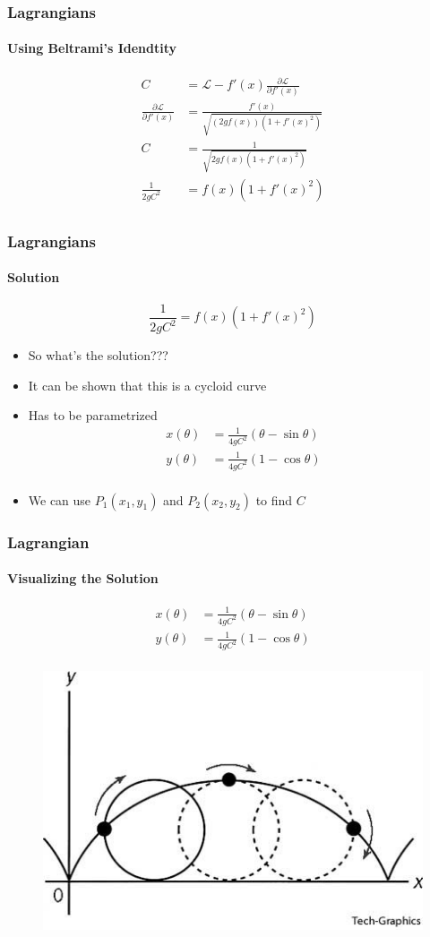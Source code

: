 \documentclass[12pt]{beamer}
\begin{document}
\begin{frame}
\frametitle{Lagrangians}
\framesubtitle{Using Beltrami's Idendtity}
\begin{align*}
    C &= \mathcal{L} - f'(x) \frac{\partial \mathcal{L}}{\partial f'(x)} \\
    \frac{\partial \mathcal{L}}{\partial f'(x)} &= \frac{f'(x)}{\sqrt{\left (2g f(x)  \right) \left (1 + f'(x)^2 \right)}} \\
    C &= \frac{1}{\sqrt{2gf(x) \left (1 + f'(x)^2 \right)}} \\
    \frac{1}{2gC^2} &= f(x) \left (1 + f'(x)^2 \right ) \\
\end{align*}
\end{frame}

\begin{frame}
\frametitle{Lagrangians}
\framesubtitle{Solution}
$$\frac{1}{2gC^2} = f(x) \left (1 + f'(x)^2 \right )$$
\pause
\begin{itemize}
    \item So what's the solution???
    \pause
    \item It can be shown that this is a cycloid curve
    \pause
    \item Has to be parametrized
    \begin{align*}
    x (\theta) &= \frac{1}{4gC^2} \left (\theta - \sin{\theta} \right) \\
    y (\theta) &= \frac{1}{4gC^2} \left (1 - \cos{\theta} \right) \\
    \end{align*}
    \pause
    \item We can use $P_1 (x_1, y_1)$ and $P_2 (x_2, y_2)$ to find $C$
\end{itemize}
\end{frame}

\begin{frame}
\frametitle{Lagrangian}
\framesubtitle{Visualizing the Solution}
\begin{align*}
    x (\theta) &= \frac{1}{4gC^2} \left (\theta - \sin{\theta} \right) \\
    y (\theta) &= \frac{1}{4gC^2} \left (1 - \cos{\theta} \right) \\
\end{align*}
\begin{figure}[b]
\pause
\includegraphics[scale = 0.3]{Cycloid.jpg}
\end{figure}


\end{frame}
\end{document}
